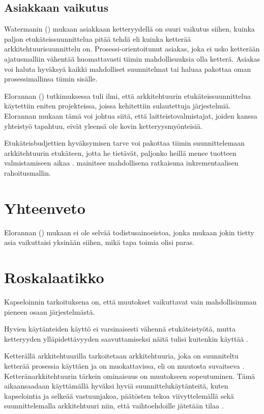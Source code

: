 \section{Asiakkaan vaikutus}
Watermanin (\citeyear{waterman_how_2015}) mukaan asiakkaan ketteryydellä on suuri vaikutus siihen, kuinka paljon etukäteissuunnittelua pitää tehdä eli kuinka ketterää arkkitehtuurisuunnittelu on. Prosessi-orientoitunut asiakas, joka ei usko ketterään ajatusmalliin vähentää huomattavasti tiimin mahdollisuuksia olla ketterä. Asiakas voi haluta hyväksyä kaikki mahdolliset suunnitelmat tai haluaa pakottaa oman prosessimallinsa tiimin sisälle. 

Elorannan (\citeyear{eloranta2015techniques}) tutkimuksessa tuli ilmi, että arkkitehtuurin etukäteissuunnittelua käytettiin eniten projekteissa, joissa kehitettiin sulautettuja järjestelmiä. Elorannan mukaan tämä voi johtua siitä, että laitteistovalmistajat, joiden kanssa yhteistyö tapahtuu, eivät yleensä ole kovin ketteryysmyönteisiä.

Etukäteisbudjettien hyväksymisen tarve voi pakottaa tiimin suunnittelemaan arkkitehtuurin etukäteen, jotta he tietävät, paljonko heillä menee tuotteen valmistamiseen aikaa \citep{waterman_how_2015}. \cite{abrahamsson2010agility} mainitsee mahdollisena ratkaisuna inkrementaalisen rahoitusmallin. 

\chapter{Yhteenveto}

Elorannan (\citeyear{eloranta2015techniques}) mukaan ei ole selvää todistusainoeistoa, jonka mukaan jokin tietty asia vaikuttaisi yksinään siihen, mikä tapa toimia olisi paras.

\chapter{Roskalaatikko}

Kapseloinnin tarkoituksena on, että muutokset vaikuttavat vain mahdollisimman pieneen osaan järjestelmästä. 

Hyvien käytänteiden käyttö ei varsinaisesti vähennä etukäteistyötä, mutta ketteryyden ylläpidettävyyden saavuttamiseksi näitä tulisi kuitenkin käyttää \citep{waterman_agility_2018_a}. 

Ketterällä arkkitehtuurilla tarkoitetaan arkkitehtuuria, joka on suunniteltu ketterää prosessia käyttäen ja on muokattavissa, eli on muutosta suvaitseva \citep{waterman_how_2015}. Ketteränarkkitehtuurin tärkein ominaisuus on muutokseen sopeutuminen. Tämä aikaansaadaan käyttämällä hyväksi hyviä suunnittelukäytänteitä, kuten kapselointia ja selkeää vastuunjakoa, päätösten tekoa viivyttelemällä sekä suunnittelemalla arkkitehtuuri niin, että vaihtoehdoille jätetään tilaa \citep{waterman_agility_2018_a}. 

